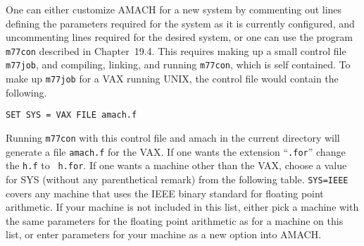 \documentclass[twoside]{MATH77}
\begin{document}
One can either customize AMACH for a new system by commenting out
lines defining the parameters required for the system as it is
currently configured, and uncommenting lines required for the desired
system, or one can use the program {\tt m77con} described in
Chapter~19.4.  This requires making up a small control file {\tt
m77job}, and compiling, linking, and running {\tt m77con}, which is
self contained.  To make up {\tt m77job} for a VAX running UNIX, the
control file would contain the following.

{\tt SET SYS = VAX\newline
FILE amach.f}

Running {\tt m77con} with this control file and amach in the current
directory will generate a file {\tt amach.f} for the VAX.  If one
wants the extension ``{\tt .for}'' change the {\tt h.f} to {\tt
h.for}.  If one wants a machine other than the VAX, choose a value
for SYS (without any parenthetical remark) from the following table.
{\tt SYS=IEEE} covers any machine that uses the IEEE binary standard
for floating point arithmetic.  If your machine is not included in
this list, either pick a machine with the same parameters for the
floating point arithmetic as for a machine on this list, or enter
parameters for your machine as a new option into AMACH.
\end{document}
